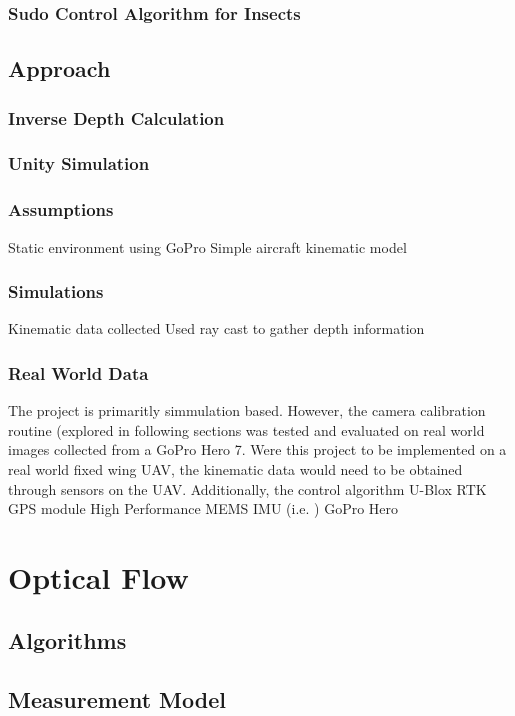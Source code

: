 \documentclass{UoNMCHA}
\numberwithin{equation}{section}
\begin{document}
\subsubsection{Sudo Control Algorithm for Insects}
\subsubsection{}
\subsection{Approach}
\subsubsection{Inverse Depth Calculation}
\subsubsection{Unity Simulation}
\subsubsection{Assumptions}
Static environment
using GoPro
Simple aircraft kinematic model
\subsubsection{Simulations}
Kinematic data collected
Used ray cast to gather depth information
\subsubsection{Real World Data}
The project is primaritly simmulation based. However, the camera calibration routine (explored in following sections was tested and evaluated on real world images collected from a GoPro Hero 7. Were this project to be implemented on a real world fixed wing UAV, the kinematic data would need to be obtained through sensors on the UAV. Additionally, the control algorithm
U-Blox RTK GPS module
High Performance MEMS IMU (i.e. )
GoPro Hero
\newpage
\section{Optical Flow}
\subsection{Algorithms}
\subsection{Measurement Model}
\end{document}

